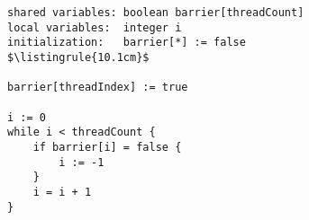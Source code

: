 \begin{center}
\begin{minipage}{\textwidth}
\begin{lstlisting}[mathescape, linewidth=10.1cm]
shared variables: boolean barrier[threadCount]
local variables:  integer i
initialization:   barrier[*] := false
$\listingrule{10.1cm}$

barrier[threadIndex] := true

i := 0
while i < threadCount {
	if barrier[i] = false {
		i := -1
	}
	i = i + 1
}
\end{lstlisting}
\end{minipage}
\end{center}
